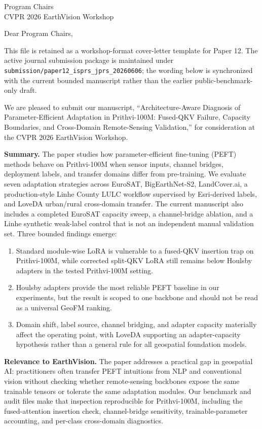 \documentclass[11pt]{letter}
\begin{document}
\begin{letter}{%
  Program Chairs \\
  CVPR 2026 EarthVision Workshop \\
}

\opening{Dear Program Chairs,}

This file is retained as a workshop-format cover-letter template for Paper 12. The active journal submission package is maintained under \texttt{submission/paper12\_isprs\_jprs\_20260606}; the wording below is synchronized with the current bounded manuscript rather than the earlier public-benchmark-only draft.

We are pleased to submit our manuscript, ``Architecture-Aware Diagnosis of Parameter-Efficient Adaptation in Prithvi-100M: Fused-QKV Failure, Capacity Boundaries, and Cross-Domain Remote-Sensing Validation,'' for consideration at the CVPR 2026 EarthVision Workshop.

\textbf{Summary.}
The paper studies how parameter-efficient fine-tuning (PEFT) methods behave on Prithvi-100M when sensor inputs, channel bridges, deployment labels, and transfer domains differ from pre-training. We evaluate seven adaptation strategies across EuroSAT, BigEarthNet-S2, LandCover.ai, a production-style Linhe County LULC workflow supervised by Esri-derived labels, and LoveDA urban/rural cross-domain transfer. The current manuscript also includes a completed EuroSAT capacity sweep, a channel-bridge ablation, and a Linhe synthetic weak-label control that is not an independent manual validation set. Three bounded findings emerge:

\begin{enumerate}
    \item Standard module-wise LoRA is vulnerable to a fused-QKV insertion trap on Prithvi-100M, while corrected split-QKV LoRA still remains below Houlsby adapters in the tested Prithvi-100M setting.
    \item Houlsby adapters provide the most reliable PEFT baseline in our experiments, but the result is scoped to one backbone and should not be read as a universal GeoFM ranking.
    \item Domain shift, label source, channel bridging, and adapter capacity materially affect the operating point, with LoveDA supporting an adapter-capacity hypothesis rather than a general rule for all geospatial foundation models.
\end{enumerate}

\textbf{Relevance to EarthVision.}
The paper addresses a practical gap in geospatial AI: practitioners often transfer PEFT intuitions from NLP and conventional vision without checking whether remote-sensing backbones expose the same trainable tensors or tolerate the same adaptation modules. Our benchmark and audit files make that inspection reproducible for Prithvi-100M, including the fused-attention insertion check, channel-bridge sensitivity, trainable-parameter accounting, and per-class cross-domain diagnostics.


\end{letter}
\end{document}
